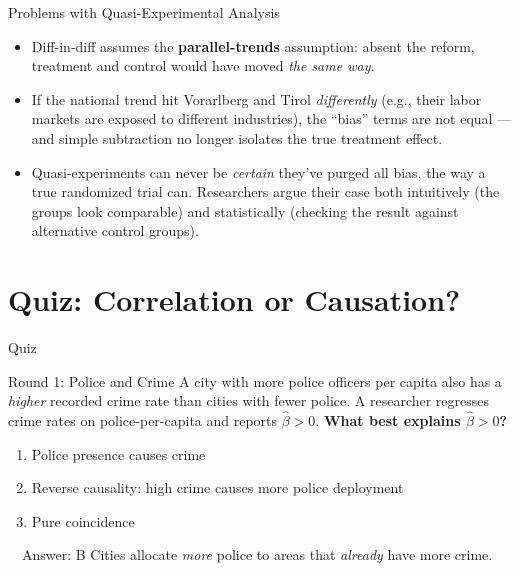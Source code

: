 \documentclass[11pt,aspectratio=169]{beamer}
\begin{document}
 

\begin{frame}{Problems with Quasi-Experimental Analysis}
  \begin{itemize}
    \item Diff-in-diff assumes the \textbf{parallel-trends} assumption: absent the reform, treatment and control would have moved \emph{the same way}.
    \item If the national trend hit Vorarlberg and Tirol \emph{differently} (e.g., their labor markets are exposed to different industries), the ``bias'' terms are not equal --- and simple subtraction no longer isolates the true treatment effect.
    \item Quasi-experiments can never be \emph{certain} they've purged all bias, the way a true randomized trial can. Researchers argue their case both intuitively (the groups look comparable) and statistically (checking the result against alternative control groups).
  \end{itemize}

\end{frame}

\section{Quiz: Correlation or Causation?}

\begin{frame}{Quiz}
  \centering
  \Large \faQuestionCircle
  
\end{frame}

\begin{frame}{Round 1: Police and Crime}
  \small
  A city with more police officers per capita also has a \emph{higher} recorded crime rate than cities with fewer police. A researcher regresses crime rates on police-per-capita and reports \(\hat\beta > 0\).
  \vspace{0.5em}
  \textbf{What best explains \(\hat\beta > 0\)?}
  \begin{enumerate}
    \item[\textbf{A}] Police presence causes crime
    \item[\textbf{B}] Reverse causality: high crime causes more police deployment
    \item[\textbf{C}] Pure coincidence
  \end{enumerate}
  \pause
  \vspace{0.3em}
  \begin{alertblock}{\faCheckCircle\ \ Answer: B}
    Cities allocate \emph{more} police to areas that \emph{already} have more crime.  
  \end{alertblock}
\end{frame}
\end{document}
